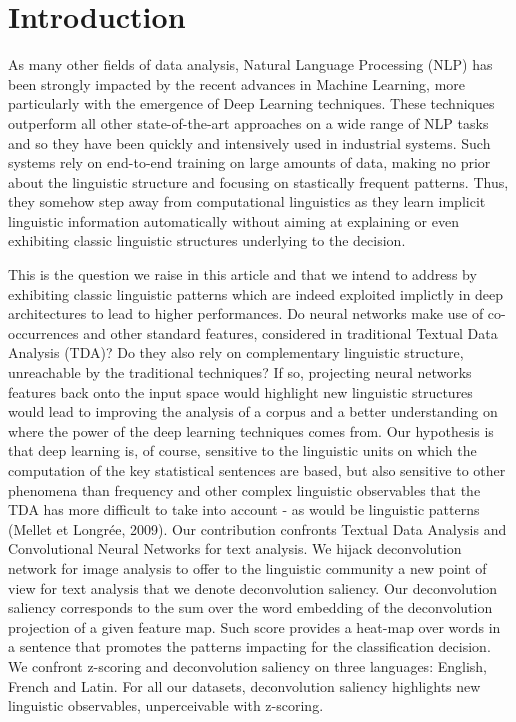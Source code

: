\section{Introduction}
As many other fields of data analysis, Natural Language Processing (NLP) has been strongly impacted by the recent advances in Machine Learning, more particularly with the emergence of Deep Learning techniques. These techniques outperform all other state-of-the-art approaches on a wide range of NLP tasks and so they have been quickly and intensively used in industrial systems. Such systems rely on end-to-end training on large amounts of data, making no prior about the linguistic structure and focusing on stastically frequent patterns. Thus, they somehow step away from computational linguistics as they learn implicit linguistic information automatically without aiming at explaining or even exhibiting classic linguistic structures underlying to the decision.

This is the question we raise in this article and that we intend to address by exhibiting classic linguistic patterns which are indeed exploited implictly in deep architectures to lead to higher performances.
Do neural networks make use of co-occurrences and other standard features, considered in traditional Textual Data Analysis (TDA)? 
Do they also rely on complementary linguistic structure, unreachable by the traditional techniques? If so, projecting neural networks 
features back onto the input space would highlight new linguistic structures would lead to improving the analysis of a corpus and a better understanding on where the power of the deep learning techniques comes from.
Our hypothesis is that deep learning is, of course, sensitive to the linguistic units on which the computation of the key statistical sentences are based, but also sensitive to other phenomena than frequency and other complex linguistic 
observables that the TDA has more difficult to take into account - as would be linguistic patterns (Mellet et Longrée, 2009).
Our contribution confronts Textual Data Analysis and Convolutional Neural Networks for text analysis. 
We hijack deconvolution network for image analysis to offer to the linguistic community a new point of view for text analysis that we denote deconvolution saliency. Our deconvolution saliency corresponds to the sum over the 
word embedding of the deconvolution projection of a given feature map. Such score provides a heat-map over 
words in a sentence that promotes the patterns impacting for the classification decision.
We confront z-scoring and deconvolution saliency on three languages: English, 
French and Latin. For all our datasets, deconvolution saliency highlights new linguistic observables, unperceivable with z-scoring.



